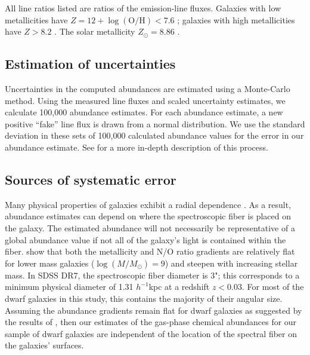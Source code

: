 All line ratios listed are ratios of the emission-line fluxes.  Galaxies with 
low metallicities have $Z = 12 + \log (\text{O}/\text{H}) < 7.6$ 
\citep{Pustilnik06}; galaxies with high metallicities have $Z > 8.2$ 
\citep{Pilyugin06}.  The solar metallicity $Z_\odot = 8.86$ \citep{Delahaye06}.


\subsection{Estimation of uncertainties}

Uncertainties in the computed abundances are estimated using a Monte-Carlo 
method.  Using the measured line fluxes and scaled uncertainty estimates, we 
calculate 100,000 abundance estimates.  For each abundance estimate, a new 
positive ``fake'' line flux is drawn from a normal distribution.  We use the 
standard deviation in these sets of 100,000 calculated abundance values for the 
error in our abundance estimate.  See \cite{Douglass17a} for a more in-depth 
description of this process.


\subsection{Sources of systematic error}

Many physical properties of galaxies exhibit a radial dependence \citep{Bell00}.  
As a result, abundance estimates can depend on where the spectroscopic fiber is 
placed on the galaxy.  The estimated abundance will not necessarily be 
representative of a global abundance value if not all of the galaxy's light is 
contained within the fiber.  \cite{Belfiore17} show that both the metallicity 
and N/O ratio gradients are relatively flat for lower mass galaxies 
($\log(M/M_\odot) = 9$) and steepen with increasing stellar mass.  In SDSS DR7, 
the spectroscopic fiber diameter is 3"; this corresponds to a minimum physical 
diameter of 1.31 $h^{-1}$kpc at a redshift $z < 0.03$.  For most of the dwarf 
galaxies in this study, this contains the majority of their angular size.  
Assuming the abundance gradients remain flat for dwarf galaxies as suggested by 
the results of \cite{Belfiore17}, then our estimates of the gas-phase chemical 
abundances for our sample of dwarf galaxies are independent of the location of 
the spectral fiber on the galaxies' surfaces.

